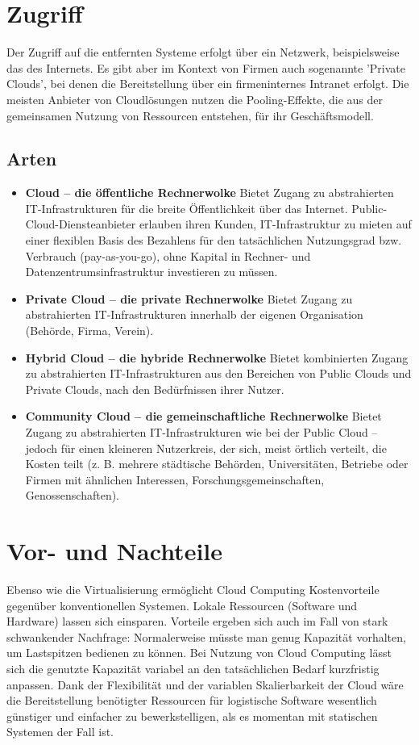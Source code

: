 \section{Zugriff}
Der Zugriff auf die entfernten Systeme erfolgt über ein Netzwerk, beispielsweise das des Internets. Es gibt aber im Kontext von Firmen auch sogenannte 'Private Clouds', bei denen die Bereitstellung über ein firmeninternes Intranet erfolgt. Die meisten Anbieter von Cloudlösungen nutzen die Pooling-Effekte, die aus der gemeinsamen Nutzung von Ressourcen entstehen, für ihr Geschäftsmodell.
\subsection{Arten}
\begin{itemize}
\item \textbf{Cloud – die öffentliche Rechnerwolke}
Bietet Zugang zu abstrahierten IT-Infrastrukturen für die breite Öffentlichkeit über das Internet. Public-Cloud-Diensteanbieter erlauben ihren Kunden, IT-Infrastruktur zu mieten auf einer flexiblen Basis des Bezahlens für den tatsächlichen Nutzungsgrad bzw. Verbrauch (pay-as-you-go), ohne Kapital in Rechner- und Datenzentrumsinfrastruktur investieren zu müssen.
\item \textbf{Private Cloud – die private Rechnerwolke}
Bietet Zugang zu abstrahierten IT-Infrastrukturen innerhalb der eigenen Organisation (Behörde, Firma, Verein).
\item \textbf{Hybrid Cloud – die hybride Rechnerwolke}
Bietet kombinierten Zugang zu abstrahierten IT-Infrastrukturen aus den Bereichen von Public Clouds und Private Clouds, nach den Bedürfnissen ihrer Nutzer.
\item \textbf{Community Cloud – die gemeinschaftliche Rechnerwolke}
Bietet Zugang zu abstrahierten IT-Infrastrukturen wie bei der Public Cloud – jedoch für einen kleineren Nutzerkreis, der sich, meist örtlich verteilt, die Kosten teilt (z. B. mehrere städtische Behörden, Universitäten, Betriebe oder Firmen mit ähnlichen Interessen, Forschungsgemeinschaften, Genossenschaften). 
\end{itemize}

\section{Vor- und Nachteile}
Ebenso wie die Virtualisierung ermöglicht Cloud Computing Kostenvorteile gegenüber konventionellen Systemen. Lokale Ressourcen (Software und Hardware) lassen sich einsparen. Vorteile ergeben sich auch im Fall von stark schwankender Nachfrage: Normalerweise müsste man genug Kapazität vorhalten, um Lastspitzen bedienen zu können. Bei Nutzung von Cloud Computing lässt sich die genutzte Kapazität variabel an den tatsächlichen Bedarf kurzfristig anpassen. Dank der Flexibilität und der variablen Skalierbarkeit der Cloud wäre die Bereitstellung benötigter Ressourcen für logistische Software wesentlich günstiger und einfacher zu bewerkstelligen, als es momentan mit statischen Systemen der Fall ist. 

